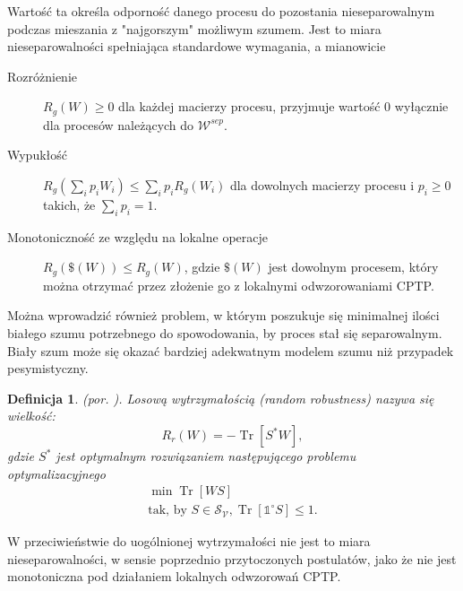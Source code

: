 \documentclass[10pt]{article} %
\newtheorem{definicja}{Definicja}
\DeclareMathOperator{\Trs}{Tr}
\newcommand{\IO}{\mathbb{1}^\circ}
\begin{document}
Wartość ta określa odporność danego procesu do pozostania nieseparowalnym podczas mieszania z "najgorszym" możliwym szumem. Jest to miara nieseparowalności spełniająca standardowe wymagania, a mianowicie
\begin{description}
\item[Rozróżnienie] $R_g(W) \geq 0$ dla każdej macierzy procesu, przyjmuje wartość 0 wyłącznie dla procesów należących do $\mathcal{W}^{sep}$. 
\item[Wypukłość] $R_g(\sum_i p_i W_i) \leq \sum_i p_i R_g(W_i)$ dla dowolnych macierzy procesu i $p_i \geq 0$ takich, że $\sum_i p_i = 1$. 
\item[Monotoniczność ze względu na lokalne operacje] $R_g\left(\$(W)\right) \leq R_g\left(W\right)$, gdzie $\$(W)$ jest dowolnym procesem, który można 
otrzymać przez złożenie go z lokalnymi odwzorowaniami CPTP.
\end{description}
Można wprowadzić również problem, w którym poszukuje się minimalnej ilości białego szumu potrzebnego do spowodowania, by proces stał się separowalnym. Biały szum może się okazać bardziej adekwatnym modelem szumu niż przypadek pesymistyczny.
\begin{definicja}
(por. \cite{causal_witness}).
Losową wytrzymałością (\textit{random robustness}) nazywa się wielkość:
\begin{equation}
R_r(W) = -\Trs\left[S^* W\right],
\end{equation}
gdzie $S^*$ jest optymalnym rozwiązaniem następującego problemu optymalizacyjnego
\begin{gather}
\min \Trs \left[ WS \right]\\
\text{tak, by } S \in \mathcal{S_V}, \Trs\left[\IO S\right] \leq 1.
\end{gather}
\end{definicja}
W przeciwieństwie do uogólnionej wytrzymałości nie jest to miara nieseparowalności, w sensie poprzednio przytoczonych postulatów, jako że nie jest monotoniczna pod działaniem lokalnych odwzorowań CPTP.
\end{document}
